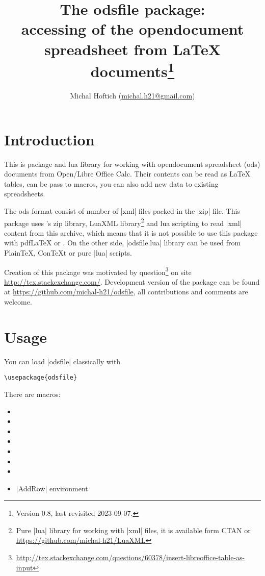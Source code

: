 \documentclass{ltxdoc}
\author{Michal Hoftich (\url{michal.h21@gmail.com})}
\title{The \textsf{odsfile} package:\\
accessing of the \textsf{opendocument spreadsheet} from \LaTeX{}
documents\thanks{Version 0.8, last revisited 2023-09-07.}
}
\newcommand\ods{\textsf{ods}\xspace}
\begin{document}
\maketitle

\tableofcontents

\section{Introduction}

This is \LuaLaTeX{} package and \textsf{lua} library for working with 
\textsf{opendocument spreadsheet} (\ods) documents from Open/Libre Office Calc. 
Their contents can be read as \LaTeX{} tables, can be pass to macros,
 you can also add new data to existing spreadsheets.

The \ods format consist of number of |xml| files packed in the |zip| file. 
This package uses \LuaTeX's zip library, LuaXML library\footnote{Pure |lua| library 
for working with |xml| files, it is available form CTAN or \url{https://github.com/michal-h21/LuaXML}} and lua scripting to read |xml| content from this archive, 
which means that it is not possible to use this package with pdf\LaTeX{} or \XeLaTeX. 
On the other side, |odsfile.lua| library can be used from Plain\TeX, 
Con\TeX{}t or pure |lua| scripts.   

Creation of this package was motivated by question\footnote{\url{http://tex.stackexchange.com/questions/60378/insert-libreoffice-table-as-input}} on site \url{http://tex.stackexchange.com/}. Development version of the package can be found at \url{https://github.com/michal-h21/odsfile}, all contributions and comments are welcome. 
\section{Usage}

You can load |odsfile| classically with
\begin{verbatim}
\usepackage{odsfile}
\end{verbatim}
There are macros:
\begin{itemize}
\item {}
\item {}
\item \cmd{\OdsNl}
\item \cmd{\OdsLastNl}
\item \cmd{\tabletemplate}
\item \cmd{\loadodsfile}
\item \cmd{\savespreadsheet}
\item |AddRow| environment 
\end{itemize}
\end{document}
